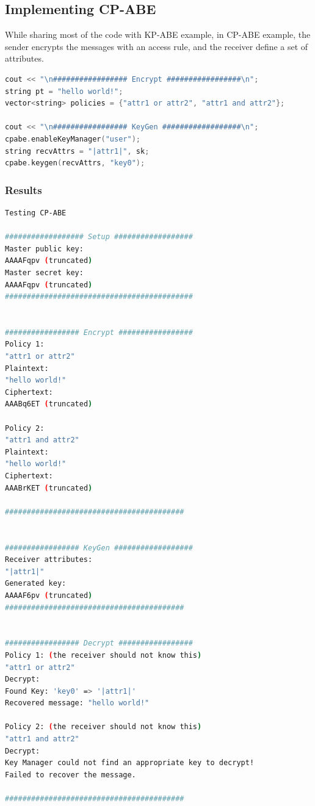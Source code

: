 \documentclass[12pt]{article}
\begin{document}
\subsection{Implementing CP-ABE}
While sharing most of the code with KP-ABE example, in CP-ABE example, the sender encrypts the messages with an access rule, and the receiver define a set of attributes.
\begin{lstlisting}[language=c++]
cout << "\n################# Encrypt #################\n";
string pt = "hello world!";
vector<string> policies = {"attr1 or attr2", "attr1 and attr2"};

cout << "\n################# KeyGen ##################\n";
cpabe.enableKeyManager("user");
string recvAttrs = "|attr1|", sk;
cpabe.keygen(recvAttrs, "key0");
\end{lstlisting}
\subsubsection{Results}
\begin{lstlisting}[language=sh]
Testing CP-ABE

################## Setup ##################
Master public key:
AAAAFqpv (truncated)
Master secret key:
AAAAFqpv (truncated)
###########################################


################# Encrypt #################
Policy 1:
"attr1 or attr2"
Plaintext:
"hello world!"
Ciphertext:
AAABq6ET (truncated)

Policy 2:
"attr1 and attr2"
Plaintext:
"hello world!"
Ciphertext:
AAABrKET (truncated)

#########################################


################# KeyGen ##################
Receiver attributes:
"|attr1|"
Generated key:
AAAAF6pv (truncated)
#########################################


################# Decrypt #################
Policy 1: (the receiver should not know this)
"attr1 or attr2"
Decrypt:
Found Key: 'key0' => '|attr1|'
Recovered message: "hello world!"

Policy 2: (the receiver should not know this)
"attr1 and attr2"
Decrypt:
Key Manager could not find an appropriate key to decrypt!
Failed to recover the message.

#########################################
\end{lstlisting}
\end{document}
